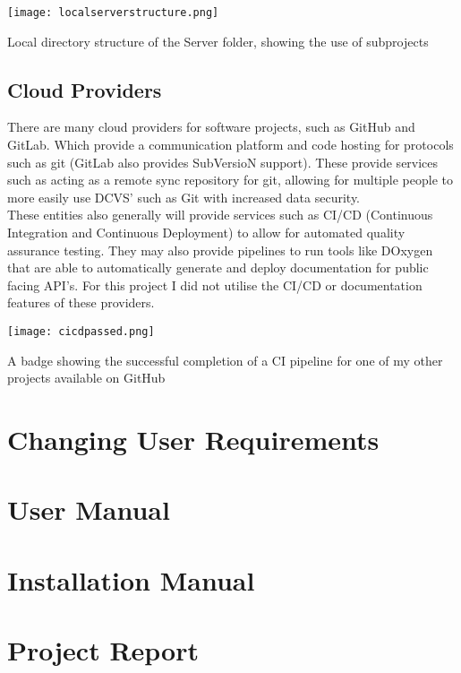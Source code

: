 \documentclass[12pt, DIV=calc]{scrartcl}
\begin{document}
\texttt{[image: localserverstructure.png]}
\caption{Local directory structure of the Server folder, showing the use of subprojects}

\subsection{Cloud Providers}
There are many cloud providers for software projects, such as GitHub and GitLab. Which provide a communication platform and code hosting for protocols such as git (GitLab also provides SubVersioN support). These provide services such as acting as a remote sync repository for git, allowing for multiple people to more easily use DCVS' such as Git with increased data security.\\

These entities also generally will provide services such as CI/CD (Continuous Integration and Continuous Deployment) to allow for automated quality assurance testing. They may also provide pipelines to run tools like DOxygen that are able to automatically generate and deploy documentation for public facing API's. For this project I did not utilise the CI/CD or documentation features of these providers.

\texttt{[image: cicdpassed.png]}
\caption{A badge showing the successful completion of a CI pipeline for one of my other projects available on GitHub}


\clearpage
\section{Changing User Requirements}




\clearpage
\section{User Manual}




\clearpage
\section{Installation Manual}




\clearpage
\section{Project Report}
\end{document}
